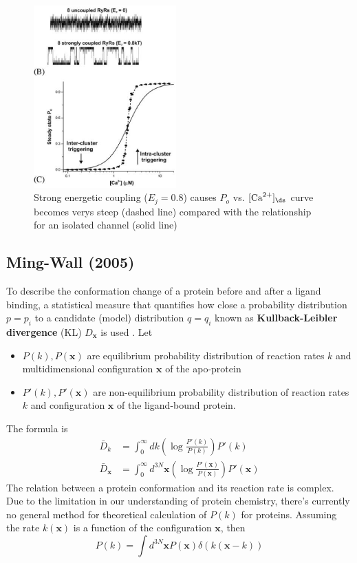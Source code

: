 \begin{figure}[hbt]
  \centerline{\includegraphics[height=7cm,
    angle=0]{./images/RyR_coupling_Sobie2006.eps}}
  \caption{Strong energetic coupling ($E_j=0.8$) causes $P_o$ vs. $[\Ca]_\ds$
  curve becomes verys steep (dashed line) compared with the relationship for an
  isolated channel (solid line)}
  \label{fig:RyRcoupled_Sobie2006}
\end{figure}


\subsection{Ming-Wall (2005)}

To describe the conformation change of a protein before and after a ligand
binding, a statistical measure that quantifies how close a probability
distribution $p={p_i}$ to a candidate (model) distribution $q={q_i}$ known as
{\bf Kullback-Leibler divergence} (KL) $D_\mathbf{x}$ is used \citep{ming2005}.
Let
\begin{itemize}
  \item $P(k), P(\mathbf{x})$ are equilibrium probability distribution of reaction
rates $k$ and multidimensional configuration $\mathbf{x}$ of the apo-protein
\item $P'(k), P'(\mathbf{x})$ are non-equilibrium probability distribution of
reaction rates $k$ and configuration $\mathbf{x}$ of the ligand-bound protein.
\end{itemize}
The formula is
\begin{equation}
\begin{split}
\bar{D}_k	&= \int_0^\infty dk \left( \log \frac{P'(k)}{P(k)} \right) P'(k) \\
\bar{D}_\mathbf{x}	&= \int_0^\infty d^{3N}\mathbf{x} \left( \log \frac{P'(\mathbf{x})}{P(\mathbf{x})}
\right) P'(\mathbf{x})
\end{split}
\end{equation}
The relation between a protein conformation and its reaction rate is complex.
Due to the limitation in our understanding of protein chemistry, there's
currently no general method for theoretical calculation of $P(k)$ for proteins.
Assuming the rate $k(\mathbf{x})$ is a function of the configuration
$\mathbf{x}$, then
\begin{equation}
P(k) = \int d^{3N} \mathbf{x}P(\mathbf{x}) \delta (k(\mathbf{x}-k))
\end{equation}


